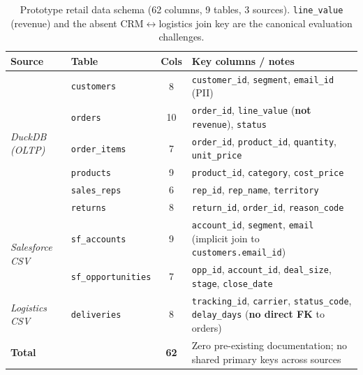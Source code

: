 \documentclass[11pt,a4paper]{article}
\begin{document}
\begin{table}[H]
\centering
\caption{Prototype retail data schema (62 columns, 9 tables, 3 sources).
  \texttt{line\_value} (revenue) and the absent CRM$\leftrightarrow$logistics join
  key are the canonical evaluation challenges.}
\label{tab:proto_schema}
\small
\begin{tabular}{llcp{5.2cm}}
\toprule
\textbf{Source} & \textbf{Table} & \textbf{Cols} & \textbf{Key columns / notes} \\
\midrule
\multirow{6}{*}{\textit{DuckDB (OLTP)}}
  & \texttt{customers}   &  8 & \texttt{customer\_id}, \texttt{segment}, \texttt{email\_id} (PII) \\
  & \texttt{orders}      & 10 & \texttt{order\_id}, \texttt{line\_value} (\textbf{not} \texttt{revenue}), \texttt{status} \\
  & \texttt{order\_items}&  7 & \texttt{order\_id}, \texttt{product\_id}, \texttt{quantity}, \texttt{unit\_price} \\
  & \texttt{products}    &  9 & \texttt{product\_id}, \texttt{category}, \texttt{cost\_price} \\
  & \texttt{sales\_reps} &  6 & \texttt{rep\_id}, \texttt{rep\_name}, \texttt{territory} \\
  & \texttt{returns}     &  8 & \texttt{return\_id}, \texttt{order\_id}, \texttt{reason\_code} \\
\midrule
\multirow{2}{*}{\textit{Salesforce CSV}}
  & \texttt{sf\_accounts}      &  9 & \texttt{account\_id}, \texttt{segment}, \texttt{email} (implicit join to \texttt{customers.email\_id}) \\
  & \texttt{sf\_opportunities} &  7 & \texttt{opp\_id}, \texttt{account\_id}, \texttt{deal\_size}, \texttt{stage}, \texttt{close\_date} \\
\midrule
\textit{Logistics CSV}
  & \texttt{deliveries}  &  8 & \texttt{tracking\_id}, \texttt{carrier}, \texttt{status\_code}, \texttt{delay\_days} (\textbf{no direct FK} to orders) \\
\midrule
\multicolumn{2}{l}{\textbf{Total}} & \textbf{62} & Zero pre-existing documentation; no shared primary keys across sources \\
\bottomrule
\end{tabular}
\end{table}
\end{document}

